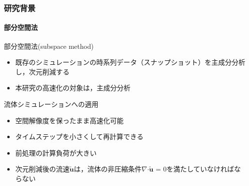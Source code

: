 \documentclass[aspectratio=169,dvipdfmx,hyperref={bookmarks=true}]{beamer}
\begin{document}
   \begin{frame}
  \frametitle{研究背景}
      \framesubtitle{部分空間法}
\begin{block}{部分空間法(subspace method)}
\begin{itemize}
\item 既存のシミュレーションの時系列データ（スナップショット）を主成分分析し，次元削減する
\item 本研究の高速化の対象は，主成分分析
\end{itemize}
\end{block}
\begin{block}{流体シミュレーションへの適用}
\begin{itemize}
	\item 空間解像度を保ったまま高速化可能
	\item タイムステップを小さくして再計算できる
	\item 前処理の計算負荷が大きい
	\item 次元削減後の流速$\bm{\widetilde{u}}$は，流体の非圧縮条件$\nabla\boldsymbol{\cdot}\bm{\widetilde{u}}$ = 0を満たしていなければならない
\end{itemize}
\end{block}
 \end{frame}
\end{document}

